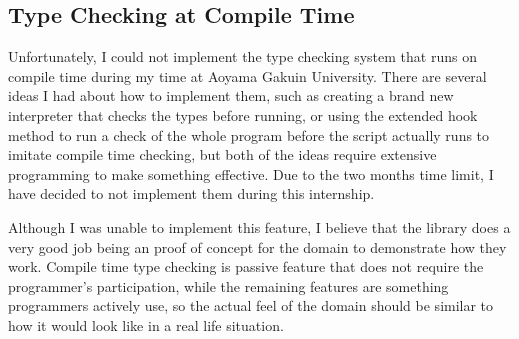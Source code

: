 \subsection{Type Checking at Compile Time}

Unfortunately, I could not implement the type checking system that runs on compile time during my time at Aoyama Gakuin University. There are several ideas I had about how to implement them, such as creating a brand new interpreter that checks the types before running, or using the extended hook method to run a check of the whole program before the script actually runs to imitate compile time checking, but both of the ideas require extensive programming to make something effective.  Due to the two months time limit, I have decided to not implement them during this internship.  

Although I was unable to implement this feature, I believe that the library does a very good job being an proof of concept for the domain to demonstrate how they work.  Compile time type checking is passive feature that does not require the programmer's participation, while the remaining features are something programmers actively use, so the actual feel of the domain should be similar to how it would look like in a real life situation.
